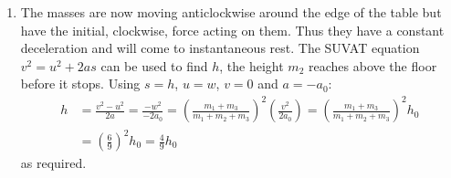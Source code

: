 \begin{problem}[A1969AMIIQ2a]
{\begin{enumerate}
\begin{enumerate}
		\item The impulse on $m_{2}$ is simply the change in its momentum as it is lifted from the floor. It starts stationary on the floor and is then moving upwards at a speed $w$:
\begin{align*} 
I &= (m_{2})(w) - (m_{2})(0) = m_{2}w = \frac{m_{2} \left(m_{1} + m_{3} \right)}{m_{1} + m_{2} + m_{3}} v = \frac{m_{2} \sqrt{2a_{0}h_{0}} \left(m_{1} + m_{3} \right)}{m_{1} + m_{2} + m_{3}} \\ 
&= \frac{(3)(1.4)(6)}{9} \text{ kg ms}^{-1} = \frac{14}{5} \text{ kg ms}^{-1} = 2.8 \text{ kg ms}^{-1}
\end{align*}

The loss in kinetic energy (KE) as $m_{2}$ starts moving is given by the total KE before, minus the KE after:
\begin{align*} 
\text{KE Loss} &= \left( \frac{1}{2}m_{1}v^{2} + \frac{1}{2}m_{3}v^{2} \right) - \left( \frac{1}{2}m_{1}w^{2} + \frac{1}{2}m_{2}w^{2} + \frac{1}{2}m_{3}w^{2} \right) \\ 
&= \frac{1}{2} \left( (m_{1} + m_{3})v^{2} - (m_{1} + m_{2} + m_{3})w^{2} \right) \\ &= \frac{1}{2}v^{2} \left( (m_{1} + m_{3}) - \frac{(m_{1} + m_{3})^{2}}{m_{1} + m_{2} + m_{3}} \right) \\ 
&= \frac{1}{2}(1.4)^{2} \left( 6 - \frac{36}{9} \right) \text{ J} \\ 
&= \frac{49}{25} \text{ J} = 1.96 \text{ J}
\end{align*}
	\end{enumerate}
	\item The masses are now moving anticlockwise around the edge of the table but have the initial, clockwise, force acting on them. Thus they have a constant deceleration and will come to instantaneous rest. The SUVAT equation $v^{2} = u^{2} + 2as$ can be used to find $h$, the height $m_{2}$ reaches above the floor before it stops. Using $s = h$, $u = w$, $v = 0$ and $a = -a_{0}$:
\begin{align*}
 h &= \frac{v^{2} - u^{2}}{2a} = \frac{-w^{2}}{-2a_{0}} = \left( \frac{m_{1} + m_{3}}{m_{1} + m_{2} + m_{3}} \right)^{2} \left( \frac{v^{2}}{2a_{0}} \right) =  \left( \frac{m_{1} + m_{3}}{m_{1} + m_{2} + m_{3}} \right)^{2} h_{0} \\ 
 &= \left( \frac{6}{9} \right)^{2} h_{0} = \frac{4}{9} h_{0}
 \end{align*} 
 as required.
\end{enumerate}}
\end{problem}